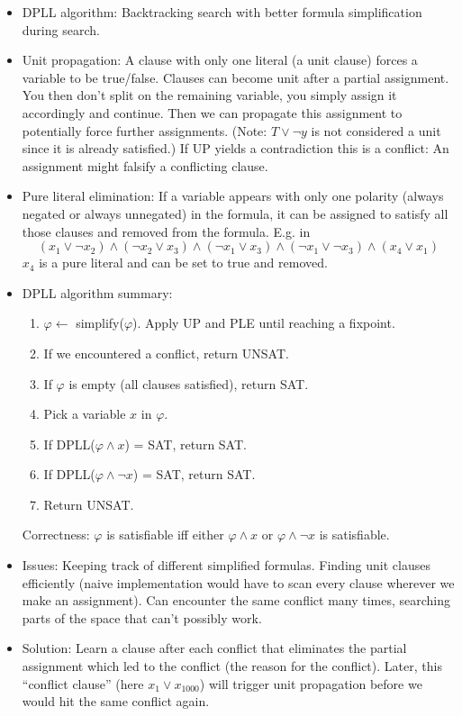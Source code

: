 \documentclass{article}
\begin{document}
\begin{itemize}
    \item DPLL algorithm: Backtracking search with better formula simplification during search.
   \item Unit propagation: A clause with only one literal (a unit clause) forces a variable to be true/false. Clauses can become unit after a partial assignment. You then don't split on the remaining variable, you simply assign it accordingly and continue. Then we can propagate this assignment to potentially force further assignments. (Note: $T\lor\neg y$ is not considered a unit since it is already satisfied.) If UP yields a contradiction this is a conflict: An assignment might falsify a conflicting clause.
    \item Pure literal elimination: If a variable appears with only one polarity (always negated or always unnegated) in the formula, it can be assigned to satisfy all those clauses and removed from the formula. E.g. in \[(x_1 \lor \neg x_2) \land (\neg x_2 \lor x_3) \land (\neg x_1 \lor x_3) \land (\neg x_1 \lor \neg x_3) \land (x_4 \lor x_1)\] $x_4$ is a pure literal and can be set to true and removed.
    \item DPLL algorithm summary:
    \begin{enumerate}
        \item $\varphi \leftarrow$ simplify($\varphi$). Apply UP and PLE until reaching a fixpoint.
        \item If we encountered a conflict, return UNSAT.
        \item If $\varphi$ is empty (all clauses satisfied), return SAT.
        \item Pick a variable $x$ in $\varphi$.
        \item If DPLL($\varphi\land x$) = SAT, return SAT.
        \item If DPLL($\varphi\land \neg x$) = SAT, return SAT.
        \item Return UNSAT.
    \end{enumerate}
    Correctness: $\varphi$ is satisfiable iff either $\varphi\land x$ or $\varphi\land \neg x$ is satisfiable.
    \item Issues: Keeping track of different simplified formulas. Finding unit clauses efficiently (naive implementation would have to scan every clause wherever we make an assignment). Can encounter the same conflict many times, searching parts of the space that can't possibly work.
    \item Solution: Learn a clause after each conflict that eliminates the partial assignment which led to the conflict (the reason for the conflict). Later, this ``conflict clause'' (here $x_1\lor x_1000$) will trigger unit propagation before we would hit the same conflict again.
\end{itemize}
\end{document}
